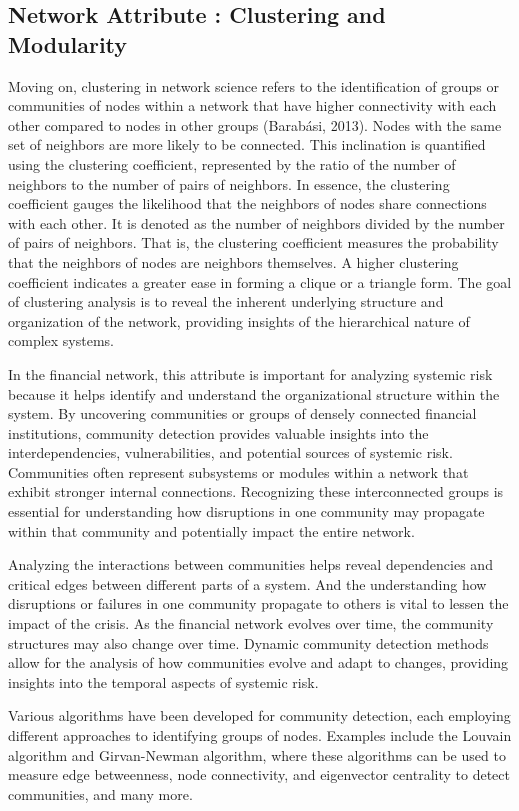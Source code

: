\documentclass[a4paper,11pt]{article}
\begin{document}
\subsection{Network Attribute : Clustering and Modularity}
Moving on, clustering in network science refers to the identification of groups or communities of nodes within a network that have higher connectivity with each other compared to nodes in other groups (Barabási, 2013). Nodes with the same set of neighbors are more likely to be connected. This inclination is quantified using the clustering coefficient, represented by the ratio of the number of neighbors to the number of pairs of neighbors. In essence, the clustering coefficient gauges the likelihood that the neighbors of nodes share connections with each other. It is denoted as the number of neighbors divided by the number of pairs of neighbors. That is, the clustering coefficient measures the probability that the neighbors of nodes are neighbors themselves. A higher clustering coefficient indicates a greater ease in forming a clique or a triangle form. The goal of clustering analysis is to reveal the inherent underlying structure and organization of the network, providing insights of the hierarchical nature of complex systems.

In the financial network, this attribute is important for analyzing systemic risk because it helps identify and understand the organizational structure within the system. By uncovering communities or groups of densely connected financial institutions, community detection provides valuable insights into the interdependencies, vulnerabilities, and potential sources of systemic risk. Communities often represent subsystems or modules within a network that exhibit stronger internal connections. Recognizing these interconnected groups is essential for understanding how disruptions in one community may propagate within that community and potentially impact the entire network.

Analyzing the interactions between communities helps reveal dependencies and critical edges between different parts of a system. And the understanding how disruptions or failures in one community propagate to others is vital to lessen the impact of the crisis. As the financial network evolves over time, the community structures may also change over time. Dynamic community detection methods allow for the analysis of how communities evolve and adapt to changes, providing insights into the temporal aspects of systemic risk.

Various algorithms have been developed for community detection, each employing different approaches to identifying groups of nodes. Examples include the Louvain algorithm and Girvan-Newman algorithm, where these algorithms can be used to measure edge betweenness, node connectivity, and eigenvector centrality to detect communities, and many more.
\end{document}
